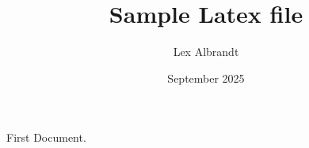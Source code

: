\documentclass[12pt, letterpaper]{article}
\title{Sample Latex file}
\author{Lex Albrandt}
\date{September 2025}
\begin{document}
First Document.
\end{document}
